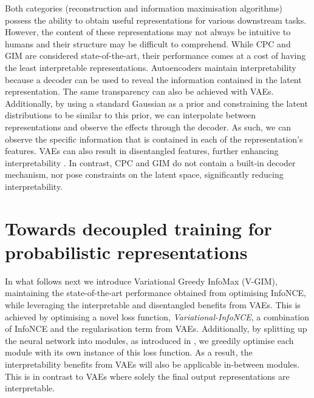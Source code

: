 		
		Both categories (reconstruction and information maximisation algorithms) possess the ability to obtain useful representations for various downstream tasks. However, the content of these representations may not always be intuitive to humans and their structure may be difficult to comprehend. While CPC and GIM are considered state-of-the-art, their performance comes at a cost of having the least interpretable representations. Autoencoders maintain interpretability because a decoder can be used to reveal the information contained in the latent representation. The same transparency can also be achieved with VAEs. Additionally, by using a standard Gaussian as a prior and constraining the latent distributions to be similar to this prior, we can interpolate between representations and observe the effects through the decoder. As such, we can observe the specific information that is contained in each of the representation's features. VAEs can also result in disentangled features, further enhancing interpretability \citep{grossuttiDeepLearningInfrared2022}. In contrast, CPC and GIM do not contain a built-in decoder mechanism, nor pose constraints on the latent space, significantly reducing interpretability.
		


\section{Towards decoupled training for probabilistic representations} \label{cha:vgim_decoupled_training_for_probabil_repr}
		In what follows next we introduce Variational Greedy InfoMax (V-GIM), maintaining the state-of-the-art performance obtained from optimising InfoNCE, while leveraging the interpretable and disentangled benefits from VAEs. This is achieved by optimising a novel loss function, \textit{Variational-InfoNCE}, a combination of InfoNCE and the regularisation term from VAEs. Additionally, by splitting up the neural network into modules, as introduced in \citep{lowePuttingEndEndtoEnd2020a}, we greedily optimise each module with its own instance of this loss function. As a result, the interpretability benefits from VAEs will also be applicable in-between modules. This is in contrast to VAEs where solely the final output representations are interpretable.		
				
		
